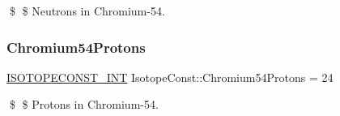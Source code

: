 \$ \$ Neutrons in Chromium-\/54. \mbox{\label{group___isotope_const-_chromium-_cr54_gaa9388dec3d4f67718af9bd58d78c340d}} 
\subsubsection{\texorpdfstring{Chromium54\+Protons}{Chromium54Protons}}
{\footnotesize\ttfamily \mbox{\hyperlink{group___isotope_const-_macros_ga5f18360b3e99483a35c32d789e62621c}{I\+S\+O\+T\+O\+P\+E\+C\+O\+N\+S\+T\+\_\+\+I\+NT}} Isotope\+Const\+::\+Chromium54\+Protons = 24}

\$ \$ Protons in Chromium-\/54. 